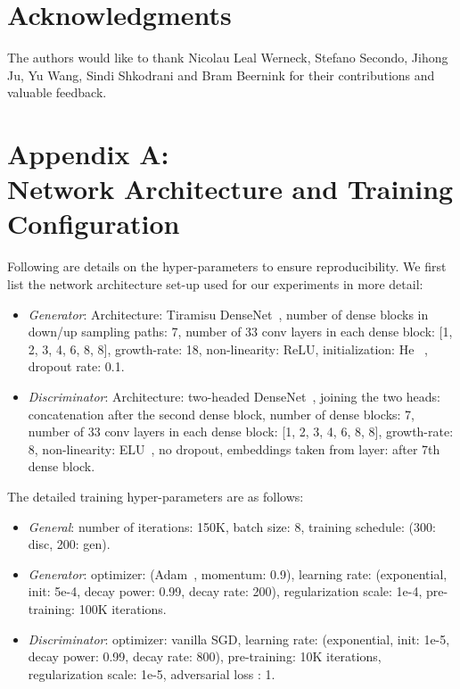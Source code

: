 \documentclass{article} \usepackage{nips13submit_e,times}
\begin{document}
\section*{Acknowledgments}

The authors would like to thank Nicolau Leal Werneck, Stefano Secondo, Jihong Ju, Yu Wang, Sindi Shkodrani and Bram Beernink for their contributions and valuable feedback.








\newpage
\appendix
\section*{Appendix A: \\ Network Architecture and Training Configuration}

Following are details on the hyper-parameters to ensure reproducibility.
We first list the network architecture set-up used for our experiments in more detail:

\begin{itemize}
  \item \emph{Generator}: Architecture: Tiramisu DenseNet~\cite{jegou2017the}, number of dense blocks in down/up sampling paths: 7, number of 33 conv layers in each dense block: [1, 2, 3, 4, 6, 8, 8], growth-rate: 18, non-linearity: ReLU, initialization: He~\cite{he2015delving} , dropout rate: 0.1.
  \item \emph{Discriminator}: Architecture: two-headed DenseNet~\cite{huang2016densely}, joining the two heads: concatenation after the second dense block, number of dense blocks: 7, number of 33 conv layers in each dense block: [1, 2, 3, 4, 6, 8, 8], growth-rate: 8, non-linearity: ELU~\cite{clevert2015fast}, no dropout, embeddings taken from layer: after 7th dense block.
\end{itemize}

\noindent
The detailed training hyper-parameters are as follows:

\begin{itemize}
    \item \emph{General}: number of iterations: 150K, batch size: 8, training schedule: (300: disc, 200: gen).
    \item \emph{Generator}: optimizer: (Adam~\cite{kingma2014adam}, momentum: 0.9), learning rate: (exponential, init: 5e-4, decay power: 0.99, decay rate: 200),  regularization scale: 1e-4, pre-training: 100K iterations.
    \item \emph{Discriminator}: optimizer: vanilla SGD, learning rate: (exponential, init: 1e-5, decay power: 0.99, decay rate: 800), pre-training: 10K iterations,  regularization scale: 1e-5, adversarial loss  : 1.
\end{itemize}
\end{document}
